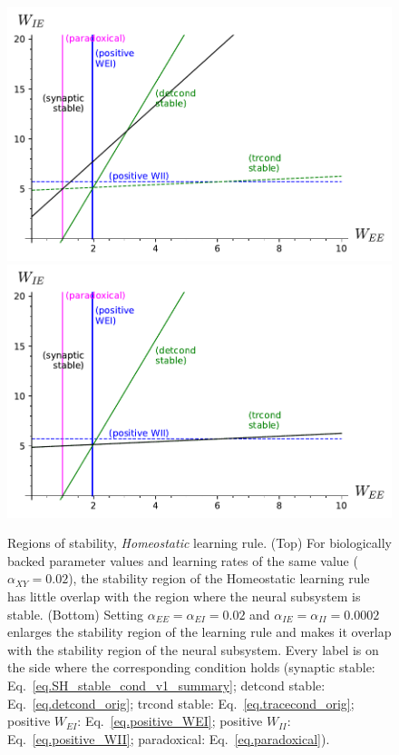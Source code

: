 \documentclass[twocolumn]{article}
\newcommand{\EE}{\mathit{EE}}
\newcommand{\EI}{\mathit{EI}}
\newcommand{\IE}{\mathit{IE}}
\newcommand{\II}{\mathit{II}}
\newcommand{\XY}{\mathit{XY}}
\begin{document}
\begin{figure}[!ht]
\centering
\includegraphics[width=\linewidth]{SH_stability}
\includegraphics[width=\linewidth]{SH_stability_slowInh.pdf}
\caption{Regions of stability, {\em Homeostatic} learning rule. (Top) For biologically backed parameter values and learning rates of the same value ($\alpha_{\XY} = 0.02$), the stability region of the Homeostatic learning rule has little overlap with the region where the neural subsystem is stable. (Bottom) Setting $\alpha_{\EE}=\alpha_{\EI}=0.02$ and $\alpha_{\IE}=\alpha_{\II}=0.0002$ enlarges the stability region of the learning rule and makes it overlap with the stability region of the neural subsystem.
Every label is on the side where the corresponding condition holds (synaptic stable: Eq.\ \ref{eq.SH_stable_cond_v1_summary}; detcond stable: Eq.\ \ref{eq.detcond_orig}; trcond stable: Eq.\ \ref{eq.tracecond_orig}; positive $W_{\EI}$: Eq.\ \ref{eq.positive_WEI}; positive $W_{\II}$: Eq.\ \ref{eq.positive_WII}; paradoxical: Eq.\ \ref{eq.paradoxical}).}
\label{fig.SH_stability}
\end{figure}
\end{document}

